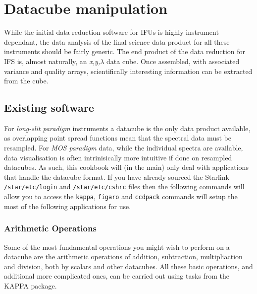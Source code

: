 \documentclass[twoside,11pt]{article}
\newcommand{\xref}[3]{#1}
\newcommand{\xlabel}[1]{}
\begin{document}
\section{\xlabel{sc16_datacube}Datacube manipulation\label{sc16_datacube}}

While the initial data reduction software for IFUs is highly instrument dependant, the data analysis of the final science data product for all these instruments should be fairly generic. The end product of the data reduction for IFS is, almost naturally, an {\em x,y,$\lambda$} data cube. Once assembled, with associated variance and quality arrays, scientifically interesting information can be extracted from the cube.

\subsection{\xlabel{sc16_exist}Existing software\label{sc16_exist}}

For {\em long-slit paradigm} instruments a datacube is the only data product available, as overlapping point spread functions mean that the spectral data must be resampled. For {\em MOS paradigm} data, while the individual spectra are available, data visualisation is often intrinisically more intuitive if done on resampled datacubes. As such, this cookbook will (in the main) only deal with applications that handle the datacube format. If you have already sourced the Starlink {\tt /star/etc/login} and {\tt /star/etc/cshrc} files then the following commands will allow you to access the {\tt kappa}, {\tt figaro} and {\tt ccdpack} commands will setup the most of the following applications for use.

\subsubsection{Arithmetic Operations}

Some of the most fundamental operations you might wish to perform on a datacube are the arithmetic operations of addition, subtraction, multipliaction and division, both by scalars and other datacubes. All these basic operations, and additional more complicated ones, can be carried out using tasks from the \xref{KAPPA}{sun95}{} package. 
\end{document}
